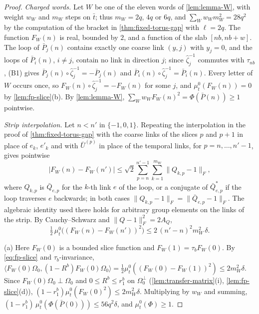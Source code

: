 \documentclass[11pt,a4paper]{amsart}
\theoremstyle{definition}
\theoremstyle{remark}
\numberwithin{equation}{section}
\newcommand{\ip}[2]{\langle #1,#2\rangle}  %
\newcommand{\norm}[1]{\lVert #1\rVert}     %
\newcommand{\abs}[1]{\lvert #1\rvert}      %
\newcommand{\Omegazero}{\Omega_0}          %
\begin{document}
\begin{proof}
\emph{Charged words.} Let $W$ be one of the eleven words of \cref{lem:lemma-W}, with weight $w_W$ and $m_W$ steps on $\bar t$; thus $m_W=2q$, $4q$ or $6q$, and $\sum_Ww_Wm_W^2=28q^2$ by the computation of the bracket in \cref{thm:fixed-torus-gap} with $\ell=2q$. The function $F_W(n)$ is real, bounded by $2$, and a function of the slab $[nb,nb+w]$. The loop of $\bar P_j(n)$ contains exactly one coarse link $(y,j)$ with $y_j=0$, and the loops of $\bar P_i(n)$, $i\ne j$, contain no link in direction $j$; since $\hat\zeta^{-1}_j$ commutes with $\tau_{nb}$, \textup{(B1)} gives $\bar P_j(n)\circ\hat\zeta^{-1}_j=-\bar P_j(n)$ and $\bar P_i(n)\circ\hat\zeta^{-1}_j=\bar P_i(n)$. Every letter of $W$ occurs once, so $F_W(n)\circ\hat\zeta^{-1}_j=-F_W(n)$ for some $j$, and $\mu^0_t(F_W(n))=0$ by \cref{lem:fp-slice}(b). By \cref{lem:lemma-W}, $\sum_Ww_WF_W(n)^2=\Phi(\bar P(n))\ge1$ pointwise.

\emph{Strip interpolation.} Let $n<n'$ in $\{-1,0,1\}$. Repeating the interpolation in the proof of \cref{thm:fixed-torus-gap} with the coarse links of the slices $p$ and $p+1$ in place of $e_k$, $e'_k$ and with $\bar U^{(p)}$ in place of the temporal links, for $p=n,\dots,n'-1$, gives pointwise
\[
\abs{F_W(n)-F_W(n')}\le\sqrt2\sum_{p=n}^{n'-1}\sum_{k=1}^{m_W}\norm{Q_{k,p}-1}_F ,
\]
where $Q_{k,p}$ is $\bar Q_{e,p}$ for the $k$-th link $e$ of the loop, or a conjugate of $\bar Q_{e,p}^*$ if the loop traverses $e$ backwards; in both cases $\norm{Q_{k,p}-1}_F=\norm{\bar Q_{e,p}-1}_F$. The algebraic identity used there holds for arbitrary group elements on the links of the strip. By Cauchy--Schwarz and $\norm{Q-1}_F^2=2A_Q$,
\begin{equation}\label{eq:box-strip}
\tfrac12\,\mu^0_t\bigl((F_W(n)-F_W(n'))^2\bigr)\le2\,(n'-n)^2m_W^2\,\delta .
\end{equation}

(a) Here $F_W(0)$ is a bounded slice function and $F_W(1)=\tau_bF_W(0)$. By \cref{eq:fp-slice} and $\tau_b$-invariance, $\ip{F_W(0)\Omegazero}{(1-R^b)F_W(0)\Omegazero}=\frac12\mu^0_t((F_W(0)-F_W(1))^2)\le2m_W^2\delta$. Since $F_W(0)\Omegazero\perp\Omegazero$ and $0\le R^b\le r_1^b$ on $\Omegazero^\perp$ (\cref{lem:transfer-matrix}(i), \cref{lem:fp-slice}(d)), $(1-r_1^b)\mu^0_t(F_W(0)^2)\le2m_W^2\delta$. Multiplying by $w_W$ and summing, $(1-r_1^b)\,\mu^0_t(\Phi(\bar P(0)))\le56q^2\delta$, and $\mu^0_t(\Phi)\ge1$.


\end{proof}
\end{document}
